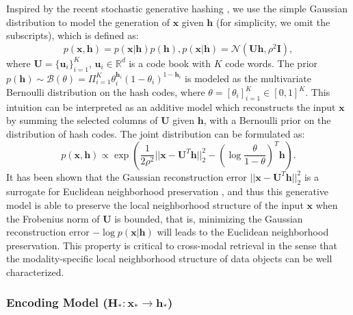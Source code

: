 \documentclass[10pt,journal,twocolumn]{IEEEtran}
\begin{document}
Inspired by the recent stochastic generative hashing \cite{SGH}, we use the simple Gaussian distribution to model the generation of $\boldsymbol x$ given $\boldsymbol h$ (for simplicity, we omit the subscripts), which is defined as:
\begin{equation}\label{eq:gaussian}
  p(\boldsymbol x, \boldsymbol h) = p(\boldsymbol x | \boldsymbol h) p(\boldsymbol h), p(\boldsymbol x | \boldsymbol h)= \mathcal{N}(\boldsymbol U \boldsymbol h, \rho^2 \boldsymbol I),
\end{equation}
where $\boldsymbol U =\{\boldsymbol u_i\}_{i=1}^K$, $\boldsymbol u_i\in \mathbb{R}^d$ is a code book with $K$ code words. The prior $p(\boldsymbol h) \sim \mathcal{B}(\theta)=\Pi_{i=1}^K \theta_i^{\boldsymbol h_i} (1-\theta_i)^{1-\boldsymbol h_i}$ is modeled as the multivariate Bernoulli distribution on the hash codes, where $\theta=[\theta_i]_{i=1}^K \in [0,1]^K$. This intuition can be interpreted as an additive model which reconstructs the input $\boldsymbol x$ by summing the selected columns of $\boldsymbol U$ given $\boldsymbol h$, with a Bernoulli prior on the distribution of hash codes. The joint distribution can be formulated as:
\begin{equation}\label{eq:joint}
  p(\boldsymbol x, \boldsymbol h) \propto \exp \left( \frac{1}{2\rho^2} || \boldsymbol x-\boldsymbol U^T \boldsymbol h ||_2^2- (\log \frac{\theta}{1-\theta})^T \boldsymbol h\right).
\end{equation}
It has been shown that the Gaussian reconstruction error $|| \boldsymbol x-\boldsymbol U^T \boldsymbol h ||_2^2$ is a surrogate for Euclidean neighborhood preservation \cite{SGH}, and thus this generative model is able to preserve the local neighborhood structure of the input $\boldsymbol x$ when the Frobenius norm of $\boldsymbol U$ is bounded, that is, minimizing the Gaussian reconstruction error $-\log p(\boldsymbol x| \boldsymbol h)$ will leads to the Euclidean neighborhood preservation. This property is critical to cross-modal retrieval in the sense that the modality-specific local neighborhood structure of data objects can be well characterized.


\subsubsection{Encoding Model ($\boldsymbol H_{\ast}: \boldsymbol x_{\ast} \rightarrow \boldsymbol h_{\ast}$)}
\end{document}
